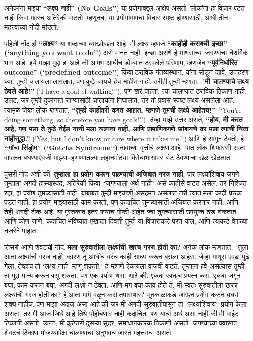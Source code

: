 अनेकांना माझ्या \textbf{“लक्ष्य नाही” (\`\`No Goals'')} या प्रयोगाबद्दल आक्षेप असतो. लोकांना हा विचार पटत नाही किंवा फारच अतिरेकी वाटतो. म्हणूनच, या प्रयोगामागचा विचार स्पष्ट होण्यासाठी, आधी तीन महत्त्वाच्या नोंदी मांडतो.

पहिली नोंद ही \textbf{“लक्ष्य”} या शब्दाच्या व्याख्येबद्दल आहे.
मी लक्ष्य म्हणजे \textbf{“काहीही करायची इच्छा” (`anything you want to do'')} असे मानत नाही. इच्छा असणे हे माणसाच्या जगण्याचा नैसर्गिक भाग आहे. इथे माझा मुद्दा हा आहे की आपण आधीच डोक्यात ठरवलेले परिणाम, म्हणजेच \textbf{“पूर्वनिर्धारित outcome” (`predefined outcome'')} किंवा ठराविक गंतव्यस्थान, यांना सोडून द्यावे. उदाहरण घ्या. तुम्ही चालायला लागलात, पण कुठे जायचे हेच माहीत नाही. तरीही तुम्ही म्हणता, \textbf{“मी चालण्याचे लक्ष्य ठेवले आहे!”} (`I have a goal of walking!''). पण खरं पाहता, त्या चालण्यात ठराविक ठिकाण नाही. उलट, जर तुम्ही दुकानात जाण्यासाठी चालायला निघालात, तर तो प्रवास स्पष्ट लक्ष्य असलेला आहे. त्यामुळे जेव्हा लोक म्हणतात, \textbf{“तुम्ही काहीतरी करत आहात, म्हणजे तुमची लक्ष्ये आहेतच!”} (`You’re doing something, so therefore you have goals!''), तेव्हा माझे उत्तर असते, \textbf{“होय, मी करत आहे, पण मला ते कुठे नेईल याची मला कल्पना नाही, आणि प्रामाणिकपणे सांगायचे तर मला त्याची चिंता नाहीसुद्धा.”} (`Yes, but I don’t know or care where it takes me.'')  
आणि हे सांगून ठेवतो,  हे \textbf{“गॉचा सिंड्रोम” (`Gotcha Syndrome'')} नावाच्या वृत्तीचे लक्षण आहे. यात लोक शिफारसी स्वतः वापरून बघण्याऐवजी माझ्या म्हणण्यातल्या लहानमोठ्या विरोधाभासांवर बोट ठेवण्याचा खेळ खेळतात.

दुसरी नोंद अशी की, \textbf{तुम्हाला हा प्रयोग करून पाहण्याची अजिबात गरज नाही.}
जर लक्ष्यांशिवाय जगणे तुम्हाला अगदी हास्यास्पद, अतिरेकी किंवा “जगण्याला अर्थ नाही” असे काहीसे वाटत असेल, तर निश्चिंत रहा,  हा प्रयोग तुमच्यासाठी नाही. याबाबत तुम्ही माझ्याशी असहमत असलात तरी त्यात मला काही फरक पडत नाही. हा प्रयोग माझ्यासाठी काम करतो, पण कदाचित तुमच्यासाठी अजिबात करणार नाही. आणि तेही अगदी ठीक आहे. या पुस्तकात इतर बर्‍याच गोष्टी आहेत ज्या तुमच्यासाठी उपयुक्त ठरू शकतात. आणि कोण जाणे, कदाचित भविष्यात एखाद्या दिवशी तुम्ही या विचाराकडे परत याल, आणि त्याकडे वेगळ्या नजरेने पाहाल.

तिसरी आणि शेवटची नोंद,  \textbf{मला सुरुवातीला लक्ष्यांची खरंच गरज होती का?}
अनेक लोक म्हणतात, “तुला आता लक्ष्यांची गरज नाही, कारण तू आधीच बरंच काही साध्य करून बसला आहेस. जेव्हा माणूस एवढा पुढे गेला, तेव्हाच तो ‘लक्ष्य नाही’ म्हणू शकतो.” हे म्हणणे ऐकायला वाजवी वाटते. तुम्हाला हवे असल्यास तुम्ही हा मुद्दा मान्य करून बसू शकता. पण एक पर्याय असा आहे की,  एकदा स्वतःच प्रयत्न करा. एकदा जगून बघा, काम करून बघा, अगदी लक्ष्ये न ठेवता. आणि मग बघा काय होते ते.
मी स्वतः सुरुवातीला खरंच लक्ष्यांची गरज होती का? हे आता मागे वळून कसे तपासणार? भूतकाळाकडे जाऊन प्रयोग करून बघणे शक्य नाहीच. पण माझा अंदाज असा आहे की जर मी अगदी सुरुवातीपासून हा “लक्ष्यांशिवाय” प्रयोग केला असता, तर मी आज जिथे आहे तिथे पोहोचणार नाही कदाचित. पण याचा अर्थ असा नाही की मी वाईट ठिकाणी असतो. उलट, मी कुठेतरी दुसर्‍या सुंदर, समाधानकारक ठिकाणी असतो. जगण्याच्या प्रवासात शेवटचं ठिकाण मोजण्यापेक्षा चालण्याचा अनुभवच जास्त महत्त्वाचा असतो.


